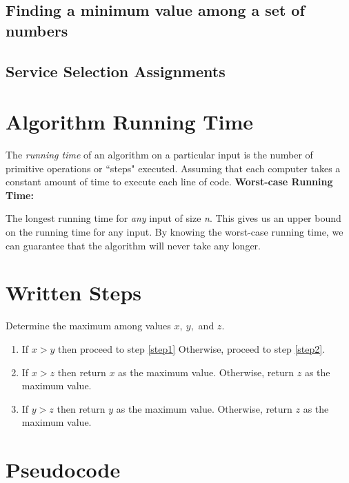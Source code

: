 \documentclass[12pt]{article}
\theoremstyle{definition}
\begin{document}
\subsection*{Finding a minimum value among a set of numbers}


\vskip 4cm

\subsection*{Service Selection Assignments}


\vskip 4cm
\newpage
\section{Algorithm Running Time}

The \emph{running time} of an algorithm on a particular input is the number of primitive operations or ``steps" executed. Assuming that each computer takes a constant amount of time to execute each line of code.  
\vskip 1cm
\textbf{Worst-case Running Time:}

The longest running time for \emph{any} input of size \emph{n}. This gives us an upper bound on the running time for any input. By knowing the worst-case running time, we can guarantee that the algorithm will never take any longer. 

\section{Written Steps}

Determine the maximum among values $x, \ y,$ and $z$.

\begin{enumerate}

\item If $x > y$ then proceed to step \ref{step1} Otherwise, proceed to step \ref{step2}.

\item If $x > z$ then return $x$ as the maximum value. Otherwise, return $z$ as the maximum value. \label{step1}

\item If $y > z$ then return $y$ as the maximum value. Otherwise, return $z$ as the maximum value. \label{step2}
\end{enumerate}

\section{Pseudocode}
\end{document}
